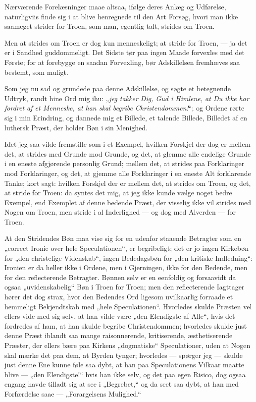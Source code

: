 \documentclass[12pt,a4paper]{book}
\begin{document}
Nærværende Forelæsninger maae altsaa, ifølge deres Anlæg og Udførelse,
naturligviis finde sig i at blive henregnede til den Art Forsøg, hvori man ikke
saameget strider for Troen, som man, egentlig talt, strides om Troen.

Men at strides om Troen er dog kun menneskeligt; at stride for Troen, --- ja
det er i Sandhed guddommeligt. Det Sidste tør paa ingen Maade forvexles med det
Første; for at forebygge en saadan Forvexling, bør Adskillelsen fremhæves saa
bestemt, som muligt.

Som jeg nu sad og grundede paa denne Adskillelse, og søgte et betegnende
Udtryk, randt hine Ord mig ihu: „\emph{jeg takker Dig, Gud i Himlene, at Du
ikke har fordret af et Menneske, at han skal begribe Christendommen!}“; og
Ordene rørte sig i min Erindring, og dannede mig et Billede, et talende
Billede, Billedet af en luthersk Præst, der holder Bøn i sin Menighed.

Idet jeg saa vilde fremstille som i et Exempel, hvilken Forskjel der dog er
mellem det, at strides med Grunde mod Grunde, og det, at glemme alle endelige
Grunde i en eneste afgjørende personlig Grund; mellem det, at strides
paa Forklaringer mod Forklaringer, og det, at gjemme alle Forklaringer i en
eneste Alt forklarende Tanke; kort sagt: hvilken Forskjel der er mellem det, at
strides om Troen, og det, at stride for Troen: da syntes det mig, at jeg ikke
kunde vælge noget bedre Exempel, end Exemplet af denne bedende Præst, der
visselig ikke vil strides med Nogen om Troen, men stride i al Inderlighed ---
og dog med Alverden --- for Troen.

At den Stridendes Bøn maa vise sig for en udenfor staaende Betragter som en
„correct Ironie over hele Speculationen“, er begribeligt; det er jo ingen
Kirkebøn for „den christelige Videnskab“, ingen Bededagsbøn for „den kritiske
Indledning“: Ironien er da heller ikke i Ordene, men i Gjerningen, ikke for den
Bedende, men for den reflecterende Betragter. Bønnen selv er en eenfoldig og
forsaavidt da ogsaa „uvidenskabelig“ Bøn i Troen for Troen; men den
reflecterende Iagttager hører det dog strax, hvor den Bedendes Ord ligesom
uvilkaarlig forraade et hemmeligt Bekjendtskab med „hele Speculationen“.
Hvorledes skulde Præsten vel ellers vide med sig selv, at han vilde være „den
Elendigste af Alle“, hvis det fordredes af ham, at han skulde begribe
Christendommen; hvorledes skulde just denne Præst iblandt saa mange
raisonnerende, kritiserende, æsthetiserende Præster, der ellers bære paa
Kirkens „dogmatiske“ Speculationer, uden at Nogen skal mærke det paa dem, at
Byrden tynger; hvorledes --- spørger jeg --- skulde just denne Ene kunne føle
saa dybt, at han paa Speculationens Vilkaar maatte blive --- „den Elendigste!“
hvis han ikke selv, og det paa egen Risico, dog ogsaa engang havde tilladt sig
at see i „Begrebet,“ og da seet saa dybt, at han med Forfærdelse saae ---
„Forargelsens Mulighed.“
\end{document}
